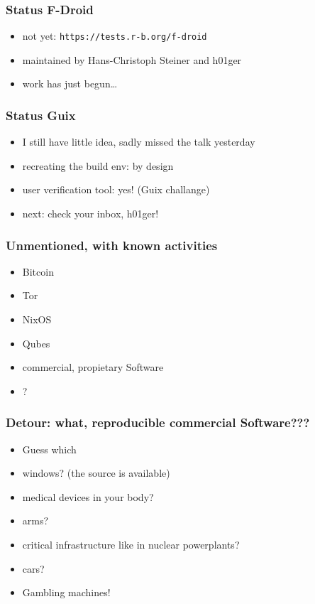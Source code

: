 \documentclass[14pt]{beamer}
\begin{document}
\begin{frame}
 \frametitle{Status F-Droid}
 \begin{itemize}
  \item not yet: \texttt{https://tests.r-b.org/f-droid}
  \item maintained by Hans-Christoph Steiner and h01ger
  \item work has just begun…
 \end{itemize}
\end{frame}

\begin{frame}
 \frametitle{Status Guix}
 \begin{itemize}
  \item I still have little idea, sadly missed the talk yesterday
  \item recreating the build env: by design
  \item user verification tool: yes! (Guix challange)
  \item<2> next: check your inbox, h01ger!
 \end{itemize}
\end{frame}

\begin{frame}
 \frametitle{Unmentioned, with known activities}
 \begin{itemize}
\item Bitcoin
\item Tor
    \item NixOS
    \item Qubes
\item    commercial, propietary Software
\item ?
 \end{itemize}
\end{frame}

\begin{frame}
 \frametitle{Detour: what, reproducible commercial Software???}
 \begin{itemize}
\item Guess which
\item <2-3>   windows? (the source is available)
\item <2-3>   medical devices in your body?
\item <2-3>   arms?
\item <2-3>   critical infrastructure like in nuclear powerplants?
\item <2-3>   cars?
\item <3> Gambling machines!
 \end{itemize}
\end{frame}
\end{document}

